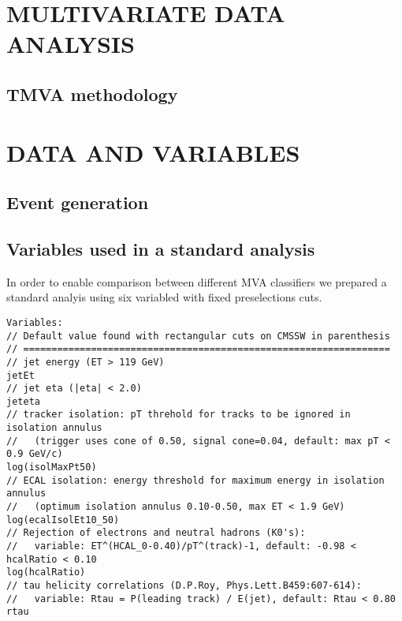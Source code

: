\documentclass[twoside,floatfix,a4wide]{revtex4}
\begin{document}
\section{MULTIVARIATE DATA ANALYSIS}
\subsection{TMVA methodology}


\section{DATA AND VARIABLES}
\subsection{Event generation}
\subsection{Variables used in a standard analysis }

In order to enable comparison between different MVA classifiers we prepared a standard
analyis using six variabled with fixed preselections cuts.

\begin{verbatim}
Variables:
// Default value found with rectangular cuts on CMSSW in parenthesis
// =================================================================
// jet energy (ET > 119 GeV)
jetEt
// jet eta (|eta| < 2.0)
jeteta
// tracker isolation: pT threhold for tracks to be ignored in isolation annulus
//   (trigger uses cone of 0.50, signal cone=0.04, default: max pT < 0.9 GeV/c)
log(isolMaxPt50)
// ECAL isolation: energy threshold for maximum energy in isolation annulus
//   (optimum isolation annulus 0.10-0.50, max ET < 1.9 GeV)
log(ecalIsolEt10_50)
// Rejection of electrons and neutral hadrons (K0's):
//   variable: ET^(HCAL_0-0.40)/pT^(track)-1, default: -0.98 < hcalRatio < 0.10
log(hcalRatio)
// tau helicity correlations (D.P.Roy, Phys.Lett.B459:607-614):
//   variable: Rtau = P(leading track) / E(jet), default: Rtau < 0.80
rtau
\end{verbatim}
\end{document}
